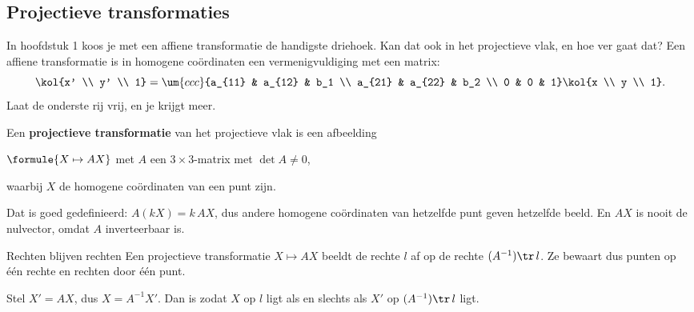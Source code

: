 \begin{oefeningen}
\end{oefeningen}

\subsection{Projectieve transformaties}

In hoofdstuk 1 koos je met een affiene transformatie de handigste driehoek. Kan dat ook in het projectieve vlak, en hoe ver gaat dat? Een affiene transformatie is in homogene coördinaten een vermenigvuldiging met een matrix:
\[ \kol{x' \\ y' \\ 1} = \um{ccc}{a_{11} & a_{12} & b_1 \\ a_{21} & a_{22} & b_2 \\ 0 & 0 & 1}\kol{x \\ y \\ 1} . \]
Laat de onderste rij vrij, en je krijgt meer.

\begin{theorie}
Een \textbf{\textcolor{accent}{projectieve transformatie}} van het projectieve vlak is een afbeelding

\vspace{1mm}
\qquad $\formule{X \mapsto AX}$ \qquad met $A$ een $3 \times 3$-matrix met $\det A \neq 0$,

\vspace{1mm}
waarbij $X$ de homogene coördinaten van een punt zijn.
\end{theorie}

Dat is goed gedefinieerd: $A(kX) = k\,AX$, dus andere homogene coördinaten van hetzelfde punt geven hetzelfde beeld. En $AX$ is nooit de nulvector, omdat $A$ inverteerbaar is.

\begin{theorie}
\begin{stelling}{Rechten blijven rechten}
Een projectieve transformatie $X \mapsto AX$ beeldt de rechte $l$ af op de rechte $(A^{-1})\tr\,l$. Ze bewaart dus punten op één rechte en rechten door één punt.
\end{stelling}

\begin{bewijs}
Stel $X' = AX$, dus $X = A^{-1}X'$. Dan is
zodat $X$ op $l$ ligt als en slechts als $X'$ op $(A^{-1})\tr\,l$ ligt.
\end{bewijs}
\end{theorie}

